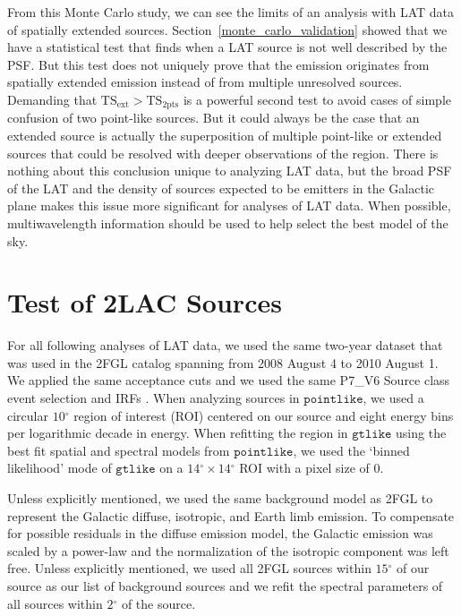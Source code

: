 \documentclass[12pt,preprint]{aastex}
\newcommand{\gev}{\text{GeV}\xspace}
\newcommand{\tsext}{{\ensuremath{\text{TS}_{\text{ext}}}}\xspace}
\newcommand{\tsinc}{\ensuremath{\text{TS}_{\text{2pts}}}\xspace}
\newcommand{\gtlike}{\ensuremath{\mathtt{gtlike}}\xspace}
\newcommand{\pointlike}{\ensuremath{\mathtt{pointlike}}\xspace}
\newcommand{\degree}{\ensuremath{^\circ}\xspace}
\begin{document}
From this Monte Carlo study, we can see the limits of an analysis with
LAT data of spatially extended sources.  Section~\ref{monte_carlo_validation}
showed that we have a statistical test that finds when a LAT source is
not well described by the PSF.  But this test does not uniquely prove
that the emission originates from spatially extended emission instead
of from multiple unresolved sources.  Demanding that $\tsext>\tsinc$
is a powerful second test to avoid cases of simple confusion of two
point-like sources. But it could always be the case that an extended
source is actually the superposition of multiple point-like or
extended sources that could be resolved with deeper observations of the
region.  There is nothing about this conclusion unique to analyzing LAT data,
but the broad PSF of the LAT and the density of sources expected to be
\gev emitters in the Galactic plane makes this issue more significant
for analyses of LAT data.  When possible, multiwavelength information should be
used to help select the best model of the sky.


\section{Test of 2LAC Sources}
\label{test_2lac_sources}


For all following analyses of LAT data, we used the same two-year dataset
that was used in the 2FGL catalog spanning from 2008 August 4 to 2010 August 1. We
applied the same acceptance cuts and we used the same P7\_V6 Source class
event selection and IRFs \citep{lat_on_orbit_psf}.  
When analyzing sources in \pointlike, we used a circular $10\degree$ region of
interest (ROI) centered on our source and eight energy bins per
logarithmic decade in energy.
When refitting the region in \gtlike using the best fit spatial and
spectral models from \pointlike, we used the `binned likelihood' mode of
\gtlike on a $14\degree\times14\degree$ ROI with a pixel size of 0.

Unless explicitly
mentioned, we used the same background model as 2FGL to represent the
Galactic diffuse, isotropic, and Earth limb emission.  To compensate for
possible residuals in the diffuse emission model, the Galactic emission
was scaled by a power-law and the normalization
of the isotropic component
was left free.  
Unless explicitly mentioned,
we used all 2FGL sources within $15\degree$ of our source as our list
of background sources and we refit the spectral parameters of all sources
within $2\degree$ of the source.
\end{document}
